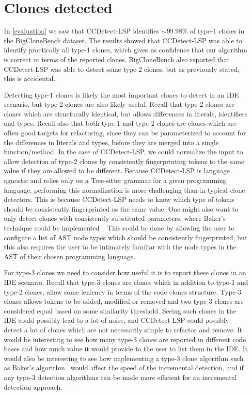 \section{Clones detected}

In \cref{evaluation} we saw that CCDetect-LSP identifies ${\sim}99.98\%$ of type-1 clones in
the BigCloneBench dataset. The results showed that CCDetect-LSP was able to identify
practically all type-1 clones, which gives us confidence that our algorithm is correct in
terms of the reported clones. BigCloneBench also reported that CCDetect-LSP was able to
detect some type-2 clones, but as previously stated, this is accidental.

Detecting type-1 clones is likely the most important clones to detect in an IDE scenario,
but type-2 clones are also likely useful. Recall that type-2 clones are clones which are
structurally identical, but allows differences in literals, identifiers and types. Recall
also that both type-1 and type-2 clones are clones which are often good targets for
refactoring, since they can be parameterized to account for the differences in literals
and types, before they are merged into a single function/method. In the case of
CCDetect-LSP, we could normalize the input to allow detection of type-2 clones by
consistently fingerprinting tokens to the same value if they are allowed to be different.
Because CCDetect-LSP is language agnostic and relies only on a Tree-sitter grammar for a
given programming language, performing this normalization is more challenging than in
typical clone detectors. This is because CCDetect-LSP needs to know which type of tokens
should be consistently fingerprinted as the same value. One might also want to only detect
clones with consistently substituted parameters, where Baker's technique could be
implemented~\cite{Bakerdup}. This could be done by allowing the user to configure a list
of AST node types which should be consistently fingerprinted, but this also requires the
user to be intimately familiar with the node types in the AST of their chosen programming
language.

For type-3 clones we need to consider how useful it is to report these clones in an IDE
scenario. Recall that type-3 clones are clones which in addition to type-1 and type-2
clones, allow some leniency in terms of the code clones structure. Type-3 clones allows
tokens to be added, modified or removed and two type-3 clones are considered equal based
on some similarity threshold. Seeing such clones in the IDE could possibly lead to a lot
of noise, and CCDetect-LSP could possibly detect a lot of clones which are not necessarily
simple to refactor and remove. It would be interesting to see how many type-3 clones are
reported in different code bases and how much value it would provide to the user to list
them in the IDE. It would also be interesting to see how implementing a type-3 clone
algorithm such as Baker's algorithm~\cite{BakerSparseDynamicProgramming} would affect the speed of the
incremental detection, and if any type-3 detection algorithms can be made more efficient
for an incremental detection approach.
